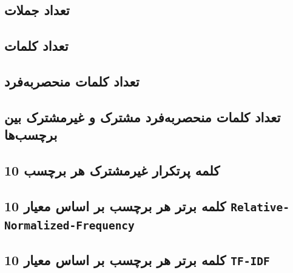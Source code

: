 \subsection{تعداد جملات}
\begin{center}
\end{center}
\subsection{تعداد کلمات}
\begin{center}
\end{center}

\clearpage

\subsection{تعداد کلمات منحصربه‌فرد}
\begin{center}
\end{center}

\subsection{تعداد کلمات منحصربه‌فرد مشترک و غیرمشترک بین برچسب‌ها}
\begin{center}
\end{center}

\subsection{10 کلمه پرتکرار غیرمشترک هر برچسب }
\begin{center}
\end{center}

\subsection{10 کلمه برتر هر برچسب بر اساس معیار  \texttt{Relative-Normalized-Frequency}}
\begin{center}
\end{center}

\clearpage

\subsection{10 کلمه برتر هر برچسب بر اساس معیار \texttt{TF-IDF}}
\begin{center}
\end{center}

